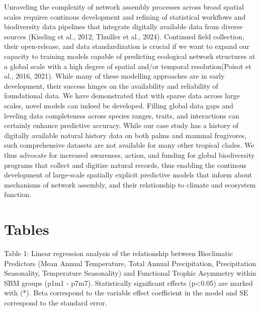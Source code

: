 \documentclass[
]{agujournal2019}
\begin{document}
Unraveling the complexity of network assembly processes across broad
spatial scales requires continous development and refining of
statistical workflows and biodiversity data pipelines that integrate
digitally available data from diverse sources (Kissling et al., 2012;
Thuiller et al., 2024). Continued field collection, their open-release,
and data standardization is crucial if we want to expand our capacity to
training models capable of predicting ecological network structures at a
global scale with a high degree of spatial and/or temporal
resolution(Poisot et al., 2016, 2021). While many of these modelling
approaches are in early development, their success hinges on the
availability and reliability of foundational data. We have demonstrated
that with sparse data across large scales, novel models can indeed be
developed. Filling global data gaps and leveling data completeness
across species ranges, traits, and interactions can certainly enhance
predictive accuracy. While our case study has a history of digitally
available natural history data on both palms and mammal frugivores, such
comprehensive datasets are not available for many other tropical clades.
We thus advocate for increased awareness, action, and funding for global
biodiversity programs that collect and digitize natural records, thus
enabling the continous development of large-scale spatially explicit
predictive models that inform about mechanisms of network assembly, and
their relationship to climate and ecosystem function.

\section{Tables}\label{tables}

Table 1: Linear regression analysis of the relationship between
Bioclimatic Predictors (Mean Annual Temperature, Total Annual
Precipitation, Precipitation Seasonality, Temperature Seasonality) and
Functional Trophic Asymmetry within SBM groups (p1m1 - p7m7).
Statistically significant effects (p\textless0.05) are marked with (*).
Beta correspond to the variable effect coefficient in the model and SE
correspond to the standard error.
\end{document}

